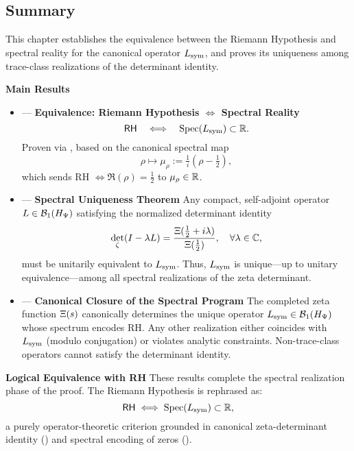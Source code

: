 \subsection*{Summary}

This chapter establishes the equivalence between the Riemann Hypothesis and spectral reality for the canonical operator \( L_{\mathrm{sym}} \), and proves its uniqueness among trace-class realizations of the determinant identity.

\textbf{Main Results}
\begin{itemize}
  \item {} — \textbf{Equivalence: Riemann Hypothesis \( \iff \) Spectral Reality}
  \[
  \mathsf{RH} \quad \Longleftrightarrow \quad \operatorname{Spec}(L_{\mathrm{sym}}) \subset \mathbb{R}.
  \]
  Proven via , based on the canonical spectral map
  \[
  \rho \mapsto \mu_\rho := \tfrac{1}{i}(\rho - \tfrac{1}{2}),
  \]
  which sends RH \( \iff \Re(\rho) = \tfrac{1}{2} \) to \( \mu_\rho \in \mathbb{R} \).

  \item {} — \textbf{Spectral Uniqueness Theorem}
  Any compact, self-adjoint operator \( L \in \mathcal{B}_1(H_{\Psi}) \) satisfying the normalized determinant identity
  \[
  \det_\zeta(I - \lambda L) = \frac{\Xi(\tfrac{1}{2} + i\lambda)}{\Xi(\tfrac{1}{2})}, \quad \forall \lambda \in \mathbb{C},
  \]
  must be unitarily equivalent to \( L_{\mathrm{sym}} \). Thus, \( L_{\mathrm{sym}} \) is unique—up to unitary equivalence—among all spectral realizations of the zeta determinant.

  \item {} — \textbf{Canonical Closure of the Spectral Program}
  The completed zeta function \( \Xi(s) \) canonically determines the unique operator \( L_{\mathrm{sym}} \in \mathcal{B}_1(H_{\Psi}) \) whose spectrum encodes RH. Any other realization either coincides with \( L_{\mathrm{sym}} \) (modulo conjugation) or violates analytic constraints. Non-trace-class operators cannot satisfy the determinant identity.
\end{itemize}

\medskip

\textbf{Logical Equivalence with RH}
These results complete the spectral realization phase of the proof. The Riemann Hypothesis is rephrased as:
\[
\mathsf{RH} \iff \operatorname{Spec}(L_{\mathrm{sym}}) \subset \mathbb{R},
\]
a purely operator-theoretic criterion grounded in canonical zeta-determinant identity () and spectral encoding of zeros ().

